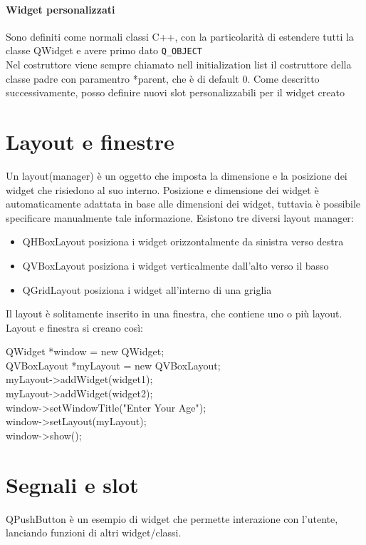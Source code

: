 \paragraph{Widget personalizzati}
Sono definiti come normali classi C++, con la particolarità di estendere tutti la classe QWidget e avere primo dato \verb|Q_OBJECT|\\
Nel costruttore viene sempre chiamato nell initialization list il costruttore della classe padre con paramentro *parent, che è di default 0. Come descritto successivamente, posso definire nuovi slot personalizzabili per il widget creato

\section{Layout e finestre}
Un layout(manager) è un oggetto che imposta la dimensione e la posizione dei widget che risiedono al suo interno. Posizione e dimensione dei widget è automaticamente adattata in base alle dimensioni dei widget, tuttavia è possibile specificare manualmente tale informazione. Esistono tre diversi layout manager:\\

\begin{itemize}
\item QHBoxLayout posiziona i widget orizzontalmente da sinistra verso destra
\item QVBoxLayout posiziona i widget verticalmente dall’alto verso il basso
\item QGridLayout posiziona i widget all’interno di una griglia
\end{itemize}

Il layout è solitamente inserito in una finestra, che contiene uno o più layout. Layout e finestra si creano così:

\begin{tcolorbox}
	QWidget *window = new QWidget;\\
	QVBoxLayout *myLayout = new QVBoxLayout;\\
	myLayout->addWidget(widget1);\\
    myLayout->addWidget(widget2);\\
	window->setWindowTitle("Enter Your Age");\\
	window->setLayout(myLayout);\\
	window->show();
\end{tcolorbox}

\section{Segnali e slot}
QPushButton è un esempio di widget che permette interazione con l'utente, lanciando funzioni di altri widget/classi.

